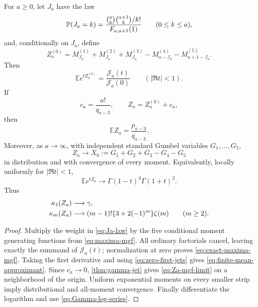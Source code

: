 \begin{theorem}
\label{thm:ram-probability}
For \(a\ge0\), let \(J_a\) have the law
\begin{equation}\label{eq:Ja-law}
 \mathbb P(J_a=k)=
 \frac{\binom ak\binom{a+1}k/k!}{F_{a,a+1}(1)}
 \qquad(0\le k\le a),
\end{equation}
and, conditionally on \(J_a\), define
\begin{equation}\label{eq:Za0}
 Z_a^{(0)}=
 M_{J_a}^{(1)}+M_{J_a}^{(2)}+M_{J_a}^{(3)}
 -M_{a-J_a}^{(4)}-M_{a+1-J_a}^{(5)}.
\end{equation}
Then
\begin{equation}\label{eq:exact-maxima-mgf}
 \boxed{\displaystyle
 \mathbb Ee^{tZ_a^{(0)}}
 =\frac{\mathscr J_a(t)}{\mathscr J_a(0)}}
 \qquad(|\Re t|<1).
\end{equation}
If
\begin{equation}\label{eq:Za-correction}
 c_a=\frac{a!}{q_{a-3}},\qquad Z_a=Z_a^{(0)}+c_a,
\end{equation}
then
\begin{equation}\label{eq:finite-mean-approximant}
 \boxed{\displaystyle\mathbb EZ_a=\frac{p_{a-3}}{q_{a-3}}.}
\end{equation}
Moreover, as \(a\to\infty\), with independent standard Gumbel variables
\(G_1,\ldots,G_5\),
\begin{equation}\label{eq:Za-all-moments}
 Z_a\longrightarrow X_0:=G_1+G_2+G_3-G_4-G_5
\end{equation}
in distribution and with convergence of every moment.  Equivalently,
locally uniformly for \(|\Re t|<1\),
\begin{equation}\label{eq:Za-mgf-limit}
 \mathbb Ee^{tZ_a}\longrightarrow
 \Gamma(1-t)^3\Gamma(1+t)^2.
\end{equation}
Thus
\begin{align}
 \kappa_1(Z_a)&\longrightarrow\gamma,\notag\\
 \kappa_m(Z_a)&\longrightarrow
 (m-1)!\{3+2(-1)^m\}\zeta(m)\qquad(m\ge2).
 \label{eq:Za-cumulants}
\end{align}
\end{theorem}

\begin{proof}
Multiply the weight in \eqref{eq:Ja-law} by the five conditional moment
generating functions from \eqref{eq:maxima-mgf}.  All ordinary factorials
cancel, leaving exactly the summand of \(\mathscr J_a(t)\); normalization at
zero proves \eqref{eq:exact-maxima-mgf}.  Taking the first derivative and
using \eqref{eq:zero-first-jets} gives
\eqref{eq:finite-mean-approximant}.  Since \(c_a\to0\),
\cref{thm:gamma-jet} gives \eqref{eq:Za-mgf-limit} on a neighborhood of the
origin.  Uniform exponential moments on every smaller strip imply
distributional and all-moment convergence.  Finally differentiate the
logarithm and use \eqref{eq:Gamma-log-series}.
\end{proof}


